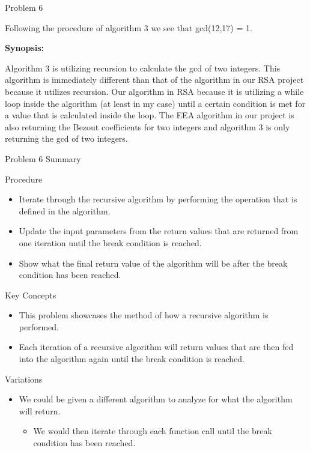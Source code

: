 \begin{problem}{Problem 6}
\begin{highlight}[Solution - \#4]
\begin{enumerate}[label = \arabic*., start = 4]
            Following the procedure of algorithm 3 we see that gcd(12,17) = 1.
        \end{enumerate}

        \noindent \textbf{Synopsis:} \vspace*{1em}

        Algorithm 3 is utilizing recursion to calculate the gcd of two integers. This algorithm is immediately different than that of the algorithm in our RSA project because it utilizes recursion.
        Our algorithm in RSA because it is utilizing a while loop inside the algorithm (at least in my case) until a certain condition is met for a value that is calculated inside the loop. The EEA
        algorithm in our project is also returning the Bezout coefficients for two integers and algorithm 3 is only returning the gcd of two integers.
    \end{highlight}
\end{problem}

\begin{summary}{Problem 6 Summary}
    \begin{statement}{Procedure}
        \begin{itemize}
            \item Iterate through the recursive algorithm by performing the operation that is defined in the algorithm.
            \item Update the input parameters from the return values that are returned from one iteration until the break condition is reached.
            \item Show what the final return value of the algorithm will be after the break condition has been reached.
        \end{itemize}
    \end{statement}
    \begin{statement}{Key Concepts}
        \begin{itemize}
            \item This problem showcases the method of how a recursive algorithm is performed.
            \item Each iteration of a recursive algorithm will return values that are then fed into the algorithm again until the break condition is reached.
        \end{itemize}
    \end{statement}
    \begin{statement}{Variations}
        \begin{itemize}
            \item We could be given a different algorithm to analyze for what the algorithm will return.
            \begin{itemize}
                \item We would then iterate through each function call until the break condition has been reached.
            \end{itemize}
        \end{itemize}
    \end{statement}
\end{summary}

